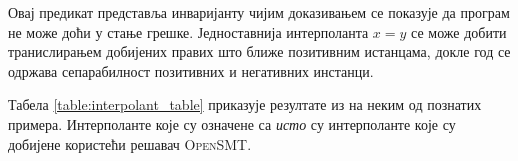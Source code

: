\documentclass[a4paper]{article}
\begin{document}
{Овај предикат представља инваријанту чијим доказивањем се показује да програм не може доћи у стање грешке.
Једноставнија интерполанта $x = y$ се може добити транислирањем добијених правих што ближе позитивним истанцама,
докле год се одржава сепарабилност позитивних и негативних инстанци.

Табела \ref{table:interpolant_table} приказује резултате из \cite{Sharma_interpolantsas} на неким од познатих
примера. Интерполанте које су означене са \textit{исто} су интерполанте које су добијене користећи решавач \textsc{OpenSMT}.


\begin{table}[]
\centering
\caption{Добијене интерполанте на неким од познатијих тест примера у области.}

\label{table:interpolant_table}

\end{table}
}
\end{document}
